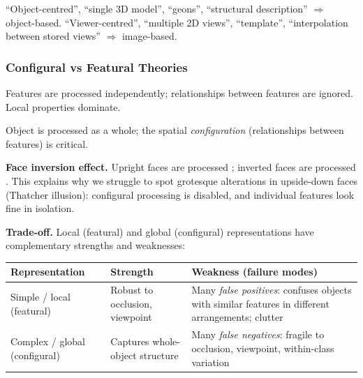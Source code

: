 \begin{tipbox}
``Object-centred'', ``single 3D model'', ``geons'', ``structural description'' $\Rightarrow$ object-based. ``Viewer-centred'', ``multiple 2D views'', ``template'', ``interpolation between stored views'' $\Rightarrow$ image-based.
\end{tipbox}

\bigseparator

\subsubsection{Configural vs Featural Theories}

\begin{defbox}
Features are processed independently; relationships between features are ignored. Local properties dominate.
\end{defbox}

\begin{defbox}
Object is processed as a whole; the spatial \emph{configuration} (relationships between features) is critical.
\end{defbox}

\textbf{Face inversion effect.} Upright faces are processed ; inverted faces are processed . This explains why we struggle to spot grotesque alterations in upside-down faces (Thatcher illusion): configural processing is disabled, and individual features look fine in isolation.

\textbf{Trade-off.} Local (featural) and global (configural) representations have complementary strengths and weaknesses:
\begin{center}
\renewcommand{\arraystretch}{1.3}
\begin{tabular}{@{} l p{4cm} p{6cm} @{}}
\toprule
\textbf{Representation} & \textbf{Strength} & \textbf{Weakness (failure modes)} \\
\midrule
Simple / local (featural) & Robust to occlusion, viewpoint & Many \emph{false positives}: confuses objects with similar features in different arrangements; clutter \\
Complex / global (configural) & Captures whole-object structure & Many \emph{false negatives}: fragile to occlusion, viewpoint, within-class variation \\
\bottomrule
\end{tabular}
\end{center}

